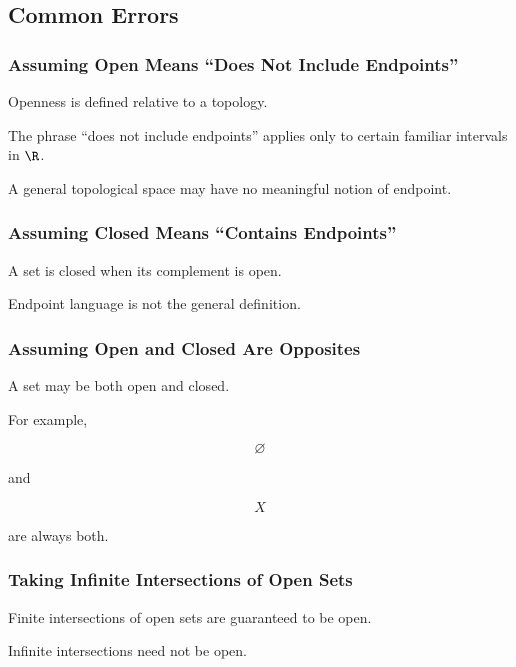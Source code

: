 \subsection{Common Errors}
\label{subsec:point-set-topology-common-errors}

\subsubsection{Assuming Open Means ``Does Not Include Endpoints''}

Openness is defined relative to a topology.

The phrase ``does not include endpoints'' applies only to certain familiar
intervals in \(\R\).

A general topological space may have no meaningful notion of endpoint.

\subsubsection{Assuming Closed Means ``Contains Endpoints''}

A set is closed when its complement is open.

Endpoint language is not the general definition.

\subsubsection{Assuming Open and Closed Are Opposites}

A set may be both open and closed.

For example,

\[
\varnothing
\]

and

\[
X
\]

are always both.

\subsubsection{Taking Infinite Intersections of Open Sets}

Finite intersections of open sets are guaranteed to be open.

Infinite intersections need not be open.

